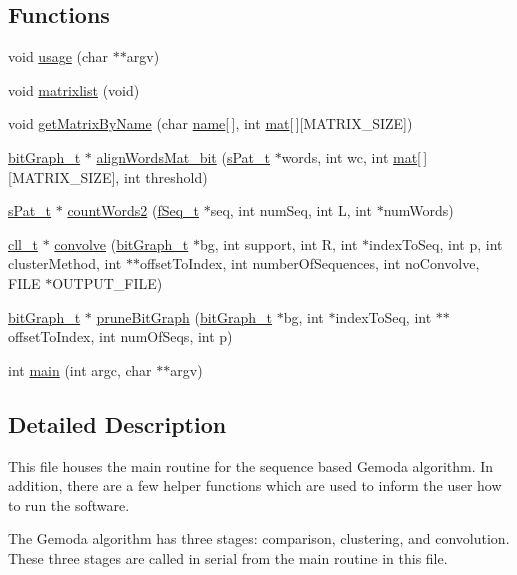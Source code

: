 \subsection*{Functions}
\begin{CompactItemize}
\item 
void \hyperlink{gemoda-s_8c_a0}{usage} (char $\ast$$\ast$argv)
\item 
void \hyperlink{gemoda-s_8c_a1}{matrixlist} (void)
\item 
void \hyperlink{gemoda-s_8c_a2}{get\-Matrix\-By\-Name} (char \hyperlink{matrixmap_8h_a0}{name}\mbox{[}$\,$\mbox{]}, int \hyperlink{matrixmap_8h_a1}{mat}\mbox{[}$\,$\mbox{]}\mbox{[}MATRIX\_\-SIZE\mbox{]})
\item 
\hyperlink{structbitGraph__t}{bit\-Graph\_\-t} $\ast$ \hyperlink{gemoda-s_8c_a3}{align\-Words\-Mat\_\-bit} (\hyperlink{structsPat__t}{s\-Pat\_\-t} $\ast$words, int wc, int \hyperlink{matrixmap_8h_a1}{mat}\mbox{[}$\,$\mbox{]}\mbox{[}MATRIX\_\-SIZE\mbox{]}, int threshold)
\item 
\hyperlink{structsPat__t}{s\-Pat\_\-t} $\ast$ \hyperlink{gemoda-s_8c_a4}{count\-Words2} (\hyperlink{structfSeq__t}{f\-Seq\_\-t} $\ast$seq, int num\-Seq, int L, int $\ast$num\-Words)
\item 
\hyperlink{structcnode}{cll\_\-t} $\ast$ \hyperlink{gemoda-s_8c_a5}{convolve} (\hyperlink{structbitGraph__t}{bit\-Graph\_\-t} $\ast$bg, int support, int R, int $\ast$index\-To\-Seq, int p, int cluster\-Method, int $\ast$$\ast$offset\-To\-Index, int number\-Of\-Sequences, int no\-Convolve, FILE $\ast$OUTPUT\_\-FILE)
\item 
\hyperlink{structbitGraph__t}{bit\-Graph\_\-t} $\ast$ \hyperlink{gemoda-s_8c_a6}{prune\-Bit\-Graph} (\hyperlink{structbitGraph__t}{bit\-Graph\_\-t} $\ast$bg, int $\ast$index\-To\-Seq, int $\ast$$\ast$offset\-To\-Index, int num\-Of\-Seqs, int p)
\item 
int \hyperlink{gemoda-s_8c_a7}{main} (int argc, char $\ast$$\ast$argv)
\end{CompactItemize}


\subsection*{Detailed Description}
This file houses the main routine for the sequence based Gemoda algorithm. In addition, there are a few helper functions which are used to inform the user how to run the software.

The Gemoda algorithm has three stages: comparison, clustering, and convolution. These three stages are called in serial from the main routine in this file.

